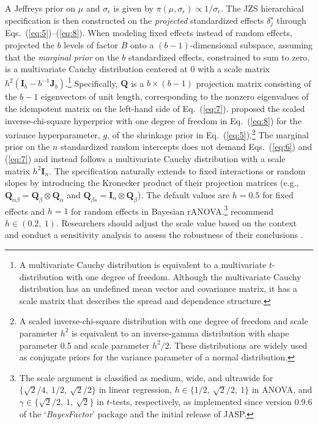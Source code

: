 \documentclass[preprint,12pt,authoryear]{elsarticle}
\begin{document}
A Jeffreys prior on $\mu$ and $\sigma_\epsilon$ is given by $\pi(\mu,\sigma_\epsilon)\propto1/\sigma_\epsilon$. The JZS hierarchical specification is then constructed on the \textit{projected} standardized effects $\delta_j^\star$ through Eqs.~(\ref{eq:5})–(\ref{eq:8}). When modeling fixed effects instead of random effects, \citet{rouder_default_2012} projected the $b$ levels of factor $B$ onto a $(b-1)$-dimensional subspace, assuming that the \textit{marginal prior} on the $b$ standardized effects, constrained to sum to zero, is a multivariate Cauchy distribution centered at 0 with a scale matrix $h^2(\mathbf{I}_b-b^{-1}\mathbf{J}_b)$.\footnote[4]{A multivariate Cauchy distribution is equivalent to a multivariate $t$-distribution with one degree of freedom. Although the multivariate Cauchy distribution has an undefined mean vector and covariance matrix, it has a scale matrix that describes the spread and dependence structure.} Specifically, $\mathbf{Q}$ is a $b\times(b-1)$ projection matrix consisting of the $b-1$ eigenvectors of unit length, corresponding to the nonzero eigenvalues of the idempotent matrix on the left-hand side of Eq.~(\ref{eq:7}). \citet{rouder_default_2012} proposed the scaled inverse-chi-square hyperprior with one degree of freedom in Eq.~(\ref{eq:8}) for the variance hyperparameter, $g$, of the shrinkage prior in Eq.~(\ref{eq:5}).\footnote[5]{A scaled inverse-chi-square distribution with one degree of freedom and scale parameter $h^2$ is equivalent to an inverse-gamma distribution with shape parameter 0.5 and scale parameter $h^2/2$. These distributions are widely used as conjugate priors for the variance parameter of a normal distribution.} The marginal prior on the $n$ standardized random intercepts does not demand Eqs.~(\ref{eq:6}) and (\ref{eq:7}) and instead follows a multivariate Cauchy distribution with a scale matrix $h^2\mathbf{I}_n$. The specification naturally extends to fixed interactions or random slopes by introducing the Kronecker product of their projection matrices (e.g., $\mathbf{Q}_{\alpha\beta}=\mathbf{Q}_\beta\otimes\mathbf{Q}_\alpha$ and $\mathbf{Q}_{\beta s}=\mathbf{I}_n\otimes\mathbf{Q}_\beta$). The default values are $h=0.5$ for fixed effects and $h=1$ for random effects in Bayesian rANOVA.\footnote[6]{The scale argument is classified as medium, wide, and ultrawide for $\{\sqrt2/4,\ \!1/2,\ \!\sqrt2/2\}$ in linear regression, $h\in\{1/2,\ \!\sqrt2/2,\ \!1\}$ in ANOVA, and $\gamma\in\{\sqrt2/2,\ \!1,\ \!\sqrt2\}$ in $t$-tests, respectively, as implemented since version 0.9.6 of the `\textit{BayesFactor}' package and the initial release of JASP.} \citet[p.~310]{rouder_bayesian_2017} recommend $h\in(0.2,\ \!1)$. Researchers should adjust the scale value based on the context and conduct a sensitivity analysis to assess the robustness of their conclusions  \citetext{%
	e.g., \citealp[p.~5]{chen_powerful_2019}; %
	\citealp[p.~625]{faghihi_spatial_2019}; %
	\citealp[p.~242]{faulkenberry_bayesian_2020}; %
	\citealp[p.~1581]{grange_effect_2017}}.
\end{document}
